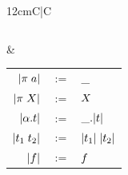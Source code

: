 \documentclass[aspectratio=169]{beamer}
\begin{document}
\begin{frame}
\begin{tabularx}{12cm}{C|C}
\begin{tabular}{rcl}
      \end{tabular}
      &
      \begin{tabular}{rcl}
        $|\pi \; a|   $& $:=$ & $\_$ \\
        $|\pi \; X|   $& $:=$ & $X $ \\
        $|\alpha. t| $& $:=$ & $\_. |t|$ \\
        $|t_1 \; t_2|  $& $:=$ & $|t_1| \; |t_2|$ \\
        $|f|                  $& $:=$ & $f$ \\
      \end{tabular}
  \end{tabularx}
\end{frame}
\end{document}
